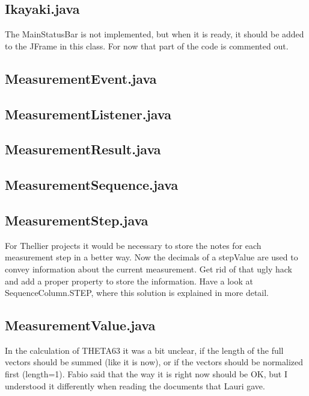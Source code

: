 \subsection{Ikayaki.java}

The MainStatusBar is not implemented, but when it is ready, it should be added to the JFrame in this class. For now that part of the code is commented out.


\subsection{MeasurementEvent.java}

\subsection{MeasurementListener.java}

\subsection{MeasurementResult.java}

\subsection{MeasurementSequence.java}

\subsection{MeasurementStep.java}

For Thellier projects it would be necessary to store the notes for each measurement step in a better way. Now the decimals of a stepValue are used to convey information about the current measurement. Get rid of that ugly hack and add a proper property to store the information. Have a look at SequenceColumn.STEP, where this solution is explained in more detail.


\subsection{MeasurementValue.java}

In the calculation of THETA63 it was a bit unclear, if the length of the full vectors should be summed (like it is now), or if the vectors should be normalized first (length=1). Fabio said that the way it is right now should be OK, but I understood it differently when reading the documents that Lauri gave.

